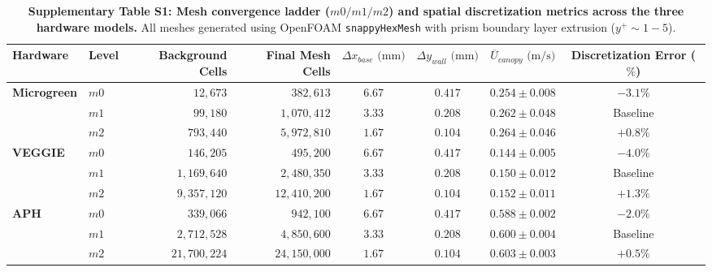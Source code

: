 \begin{table}[t]
\centering
\small
\caption{\textbf{Supplementary Table S1: Mesh convergence ladder ($m0/m1/m2$) and spatial discretization metrics across the three hardware models.} All meshes generated using OpenFOAM \texttt{snappyHexMesh} with prism boundary layer extrusion ($y^+ \sim 1 - 5$).}
\label{tab:mesh_convergence}
\begin{tabularx}{\textwidth}{llrrcccc}
\toprule
\textbf{Hardware} & \textbf{Level} & \textbf{Background Cells} & \textbf{Final Mesh Cells} & $\Delta x_{base}\text{ (mm)}$ & $\Delta y_{wall}\text{ (mm)}$ & $\overline{U}_{canopy}\text{ (m/s)}$ & \textbf{Discretization Error ($\%$)} \\
\midrule
\textbf{Microgreen} & $m0$ & $12,673$ & $382,613$ & $6.67$ & $0.417$ & $0.254 \pm 0.008$ & $-3.1\%$ \\
& $m1$ & $99,180$ & $1,070,412$ & $3.33$ & $0.208$ & $0.262 \pm 0.048$ & Baseline \\
& $m2$ & $793,440$ & $5,972,810$ & $1.67$ & $0.104$ & $0.264 \pm 0.046$ & $+0.8\%$ \\
\midrule
\textbf{VEGGIE} & $m0$ & $146,205$ & $495,200$ & $6.67$ & $0.417$ & $0.144 \pm 0.005$ & $-4.0\%$ \\
& $m1$ & $1,169,640$ & $2,480,350$ & $3.33$ & $0.208$ & $0.150 \pm 0.012$ & Baseline \\
& $m2$ & $9,357,120$ & $12,410,200$ & $1.67$ & $0.104$ & $0.152 \pm 0.011$ & $+1.3\%$ \\
\midrule
\textbf{APH} & $m0$ & $339,066$ & $942,100$ & $6.67$ & $0.417$ & $0.588 \pm 0.002$ & $-2.0\%$ \\
& $m1$ & $2,712,528$ & $4,850,600$ & $3.33$ & $0.208$ & $0.600 \pm 0.004$ & Baseline \\
& $m2$ & $21,700,224$ & $24,150,000$ & $1.67$ & $0.104$ & $0.603 \pm 0.003$ & $+0.5\%$ \\
\bottomrule
\end{tabularx}
\end{table}
